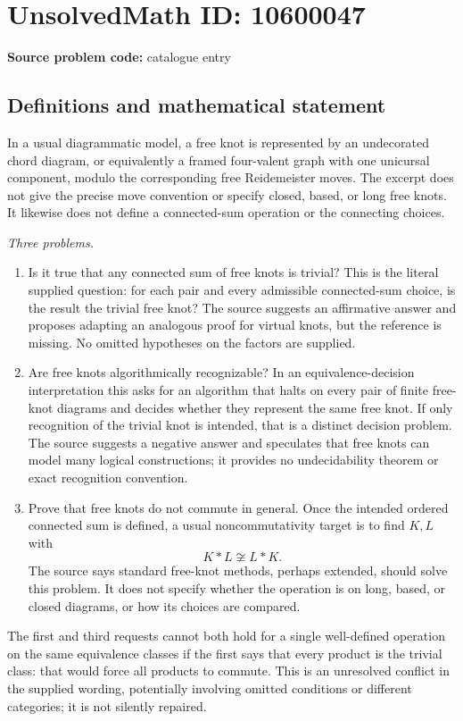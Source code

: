 \documentclass[11pt]{article}
\begin{document}
\section*{UnsolvedMath ID: 10600047}
\textbf{Source problem code:} catalogue entry
\subsection{Definitions and mathematical statement}
In a usual diagrammatic model, a free knot is represented by an undecorated chord diagram, or equivalently a framed four-valent graph with one unicursal component, modulo the corresponding free Reidemeister moves. The excerpt does not give the precise move convention or specify closed, based, or long free knots. It likewise does not define a connected-sum operation or the connecting choices.

\emph{Three problems.}
\begin{enumerate}
\item Is it true that any connected sum of free knots is trivial? This is the literal supplied question: for each pair and every admissible connected-sum choice, is the result the trivial free knot? The source suggests an affirmative answer and proposes adapting an analogous proof for virtual knots, but the reference is missing. No omitted hypotheses on the factors are supplied.
\item Are free knots algorithmically recognizable? In an equivalence-decision interpretation this asks for an algorithm that halts on every pair of finite free-knot diagrams and decides whether they represent the same free knot. If only recognition of the trivial knot is intended, that is a distinct decision problem. The source suggests a negative answer and speculates that free knots can model many logical constructions; it provides no undecidability theorem or exact recognition convention.
\item Prove that free knots do not commute in general. Once the intended ordered connected sum is defined, a usual noncommutativity target is to find \(K,L\) with
\[
 K*L\not\cong L*K.
\]
The source says standard free-knot methods, perhaps extended, should solve this problem. It does not specify whether the operation is on long, based, or closed diagrams, or how its choices are compared.
\end{enumerate}
The first and third requests cannot both hold for a single well-defined operation on the same equivalence classes if the first says that every product is the trivial class: that would force all products to commute. This is an unresolved conflict in the supplied wording, potentially involving omitted conditions or different categories; it is not silently repaired.
\end{document}
